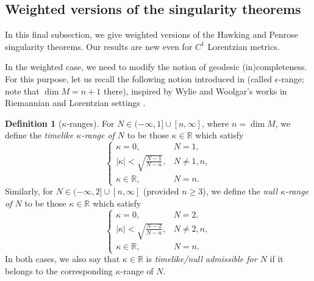 \documentclass[a4paper,11pt]{article}
\numberwithin{equation}{section}
\theoremstyle{definition}
\newtheorem{Definition}{Definition}[section]
\theoremstyle{plain}
\newcommand{\R}{\mathbb R}
\begin{document}
\subsection{Weighted versions of the singularity theorems}
\label{Subsection: weighted singularity theorems}

In this final subsection, we give weighted versions of the Hawking and Penrose singularity theorems.
Our results are new even for $C^1$ Lorentzian metrics.

In the weighted case, we need to modify the notion of geodesic (in)completeness.
For this purpose, let us recall the following notion introduced in \cite{LuMinguzziOhtaSingularity} (called $\epsilon$-range; note that $\dim M=n+1$ there), inspired by Wylie and Woolgar's works in Riemannian and Lorentzian settings \cite{WW16,WW18,Wylie17}.

\begin{Definition}[$\kappa$-ranges]
For $N \in (-\infty,1] \cup [n,\infty]$, where $n=\dim M$, we define the \emph{timelike $\kappa$-range of $N$} to be those $\kappa \in \R$ which satisfy
\begin{equation*}
\begin{cases}
    \kappa = 0, & N = 1,\\
    |\kappa| < \sqrt{\frac{N-1}{N - n}}, & N \neq 1,n, \\
    \kappa \in \R, & N=n.
\end{cases}
\end{equation*}
Similarly, for $N \in (-\infty,2] \cup [n,\infty]$ (provided $n \ge 3$), we define the \emph{null $\kappa$-range of $N$} to be those $\kappa \in \R$ which satisfy
\begin{equation*}
\begin{cases}
    \kappa = 0, & N = 2,\\
    |\kappa| < \sqrt{\frac{N -2}{N - n}}, & N \neq 2,n, \\
    \kappa \in \R, & N=n.
\end{cases}
\end{equation*}
In both cases, we also say that $\kappa \in \R$ is \emph{timelike/null admissible for $N$} if it belongs to the corresponding $\kappa$-range of $N$.
\end{Definition}
\end{document}
